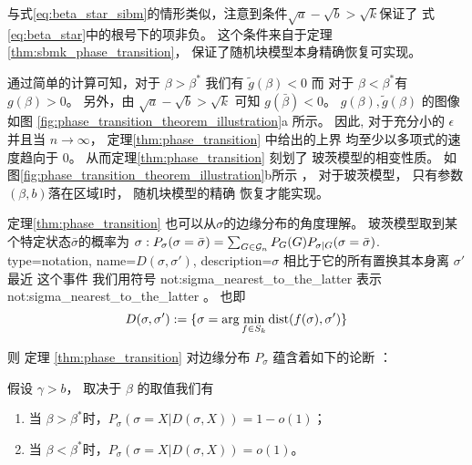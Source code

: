 与式\eqref{eq:beta_star_sibm}的情形类似，注意到条件$\sqrt{a} - \sqrt{b} > \sqrt{k}$保证了
式\eqref{eq:beta_star}中的根号下的项非负。
这个条件来自于定理\ref{thm:sbmk_phase_transition}，
保证了随机块模型本身精确恢复可实现。


通过简单的计算可知，对于 $\beta> \beta^*$ 我们有
$\tilde{g}(\beta) < 0$ 而 对于 $\beta < \beta^*$有
$g(\beta)>0$。
另外，由 $\sqrt{a} - \sqrt{b} > \sqrt{k}$ 可知
$g(\bar{\beta}) < 0$。
$g(\beta), \tilde{g}(\beta)$ 的图像
如图 \ref{fig:phase_transition_theorem_illustration}a 所示。
因此, 对于充分小的
$\epsilon$ 并且当 $n \to \infty$，
定理\ref{thm:phase_transition} 中给出的上界
均至少以多项式的速度趋向于 $0$。
从而定理\ref{thm:phase_transition} 
刻划了
玻茨模型的相变性质。
如图\ref{fig:phase_transition_theorem_illustration}b所示
， 对于玻茨模型， 只有参数$(\beta, b)$落在区域I时，
随机块模型的精确
恢复才能实现。

定理\ref{thm:phase_transition}
也可以从$\sigma$的边缘分布的角度理解。
玻茨模型取到某个特定状态$\bar{\sigma}$的概率为
 $\sigma: P_{\sigma}(\sigma =\bar{\sigma})
=\sum_{G \in \mathcal{G}_n}P_G(G)P_{\sigma |G}(\sigma=\bar{\sigma})$.
{
  type=notation,
  name={\ensuremath{D(\sigma, \sigma')}},
  description={$\sigma$ 相比于它的所有置换其本身离 $\sigma'$ 最近
  这个事件}
}
我们用符号 \gls{not:sigma_nearest_to_the_latter} 表示 \glsdesc{not:sigma_nearest_to_the_latter}
。
也即
\begin{equation}
	\label{eq:D_sigma_sigma_prime}
D(\sigma, \sigma') := \{ \sigma = \arg\min_{f \in S_k} \operatorname{dist}(f(\sigma), \sigma')  \}
\end{equation}

则 定理 \ref{thm:phase_transition} 
对边缘分布 $P_{\sigma}$ 蕴含着如下的论断
：
\begin{corollary}\label{cor:phase4}
假设 $\gamma > b$， 取决于 $\beta$ 的取值我们有
\begin{enumerate}
	\item 当 $\beta > \beta^*$时，$P_{\sigma}(\sigma = X | D(\sigma, X))  = 1-o(1)$；
	\item 当 $\beta < \beta^*$时，$P_{\sigma}(\sigma = X | D(\sigma, X))  = o(1)$。
\end{enumerate}
\end{corollary}

